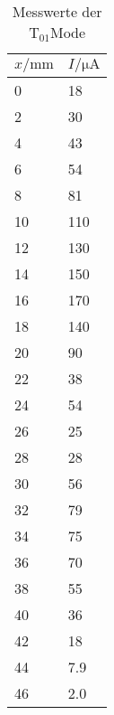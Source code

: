 \begin{table}[H]
  \centering
  \caption{Messwerte der $\text{T}_{01}$Mode}
  \label{tab:tabe4}
    \begin{tabular}{l l}
    \toprule
    $ x / \si{\milli\meter} $ & $ I / \si{\micro\ampere} $ \\
    \midrule
    0 & 18 \\
    2 & 30 \\
    4 & 43 \\
    6 & 54 \\
    8 & 81 \\
    10 & 110 \\
    12 & 130 \\
    14 & 150 \\
    16 & 170 \\
    18 & 140 \\
    20 & 90 \\
    22 & 38 \\
    24 & 54 \\
    26 & 25 \\
    28 & 28 \\
    30 & 56\\
    32 & 79 \\
    34 & 75 \\
    36 & 70 \\
    38 & 55 \\
    40 & 36 \\
    42 & 18 \\
    44 & 7.9 \\
    46 & 2.0 \\



          \bottomrule
        \end{tabular}
    \end{table}
